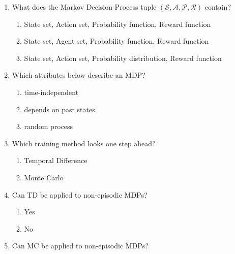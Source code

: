 \documentclass{report}
\numberwithin{equation}{section}
\begin{document}
\begin{enumerate}
    \item What does the Markov Decision Process tuple \((\mathcal{S}, \mathcal{A}, \mathcal{P}, \mathcal{R})\) contain?
    \begin{enumerate}[label=\alph*.]
        \item State set, Action set, Probability function, Reward function
        \item State set, Agent set, Probability function, Reward function
        \item State set, Action set, Probability distribution, Reward function
    \end{enumerate}
    \item Which attributes below describe an MDP?
    \begin{enumerate}[label=\alph*.]
        \item time-independent
        \item depends on past states
        \item random process
    \end{enumerate}
    \item Which training method looks one step ahead?
    \begin{enumerate}[label=\alph*.]
        \item Temporal Difference
        \item Monte Carlo
    \end{enumerate}
    \item Can TD be applied to non-episodic MDPs?
    \begin{enumerate}[label=\alph*.]
        \item Yes
        \item No
    \end{enumerate}
    \item Can MC be applied to non-episodic MDPs?

\end{enumerate}
\end{document}
